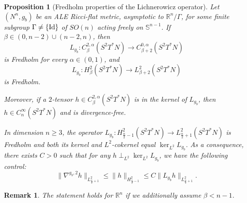 \documentclass[a4paper,11pt,reqno]{amsart}
\newtheorem{prop}[defn]{Proposition}
\newtheorem{rk}[defn]{Remark}
\def\RR{\mathbb{R}}
\numberwithin{equation}{section}
\begin{document}
	\begin{prop}[Fredholm properties of the Lichnerowicz operator] \label{prop-lic-fred}
		Let $(N^n,g_b)$ be an ALE Ricci-flat metric, asymptotic to $\RR^n\slash\Gamma$, for some finite subgroup $\Gamma\neq \{\textup{Id}\}$ of $SO(n)$ acting freely on $\mathbb{S}^{n-1}$.  If $\beta\in(0,n-2)\cup(n-2,n)$, then $$L_{g_b}:C^{2,\alpha}_{\beta}(S^2T^*N)\rightarrow C^{0,\alpha}_{\beta+2}(S^2T^*N)$$
		is Fredholm for every $\alpha\in(0,1)$, and
		$$L_{g_b}:H^2_{\beta}(S^2T^*N)\rightarrow L^2_{\beta+2}(S^2T^*N)$$
		is Fredholm.
		
		Moreover, if a $2$-tensor $h\in C^{2,\alpha}_{\beta}(S^2T^*N)$  is in the kernel of $L_{g_b}$, then $h\in C^{\infty}_{n}(S^2T^*N)$ and is divergence-free.
		
		In dimension $n\geq 3$, the operator $L_{g_b}:H^2_{\frac{n}{2}-1}(S^2T^*N)\rightarrow L^2_{\frac{n}{2}+1}(S^2T^*N)$ is Fredholm and both its kernel and $L^2$-cokernel equal $\ker_{L^2}L_{g_b}$. As a consequence, there exists $C>0$ such that for any $h\perp_{L^2} \ker_{L^2}L_{g_b}$, we have the following control:
		\begin{equation}
		\|\nabla^{g_b, 2}h\|_{L^2_{\frac{n}{2} +1}}\leq\|h\|_{H^2_{\frac{n}{2}-1}} \leq C \|L_{g_b}h\|_{L^2_{\frac{n}{2}+1}}.\label{controle hessienne lic n}
		\end{equation}	
	\end{prop}
	\begin{rk}
		The statement holds for $\mathbb{R}^n$ if we additionally assume $\beta<n-1$.
	\end{rk}
\end{document}
